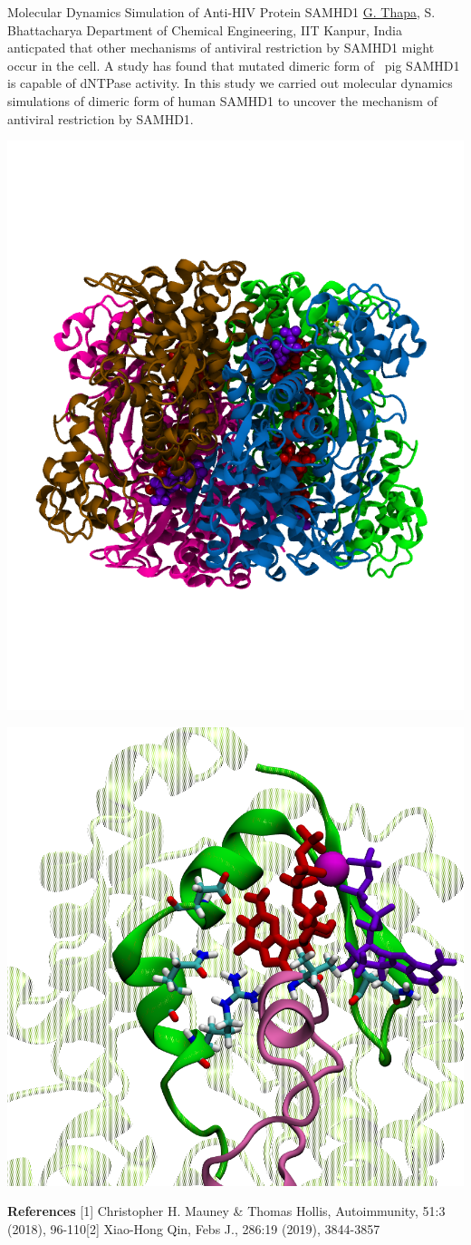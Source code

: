 \begin{abstract_online}{Molecular Dynamics Simulation of Anti-HIV Protein SAMHD1 }{%
        \underline{G. Thapa}, S. Bhattacharya}{%
        }{%
        Department of Chemical Engineering, IIT Kanpur, India}
anticpated that other mechanisms of antiviral restriction by  SAMHD1 might occur in the cell. A study has found that mutated dimeric  form of  pig SAMHD1 is capable of dNTPase activity. In this study we  carried out molecular dynamics simulations of dimeric form of human SAMHD1  to uncover the mechanism of antiviral restriction by SAMHD1.  \begin{center}  \includegraphics[scale=0.3]{abstracts/txt/figures/thapa1.png}  \caption{\textbf{Figure 1:} SAMHD1 tetramer}  \end{center} \begin{center}  \includegraphics[scale=0.3]{abstracts/txt/figures/thapa2.png}  \caption{\textbf{Figure 2:} $GTP$-$MG^{+2}$-$dNTP$ cross bridge}  \end{center} 
    
        \textbf{References} \newline{}[1] Christopher H. Mauney & Thomas Hollis, Autoimmunity, 51:3 (2018),  96-110\newline{}[2] Xiao-Hong Qin, Febs J., 286:19 (2019), 3844-3857
    \end{abstract_online}
    